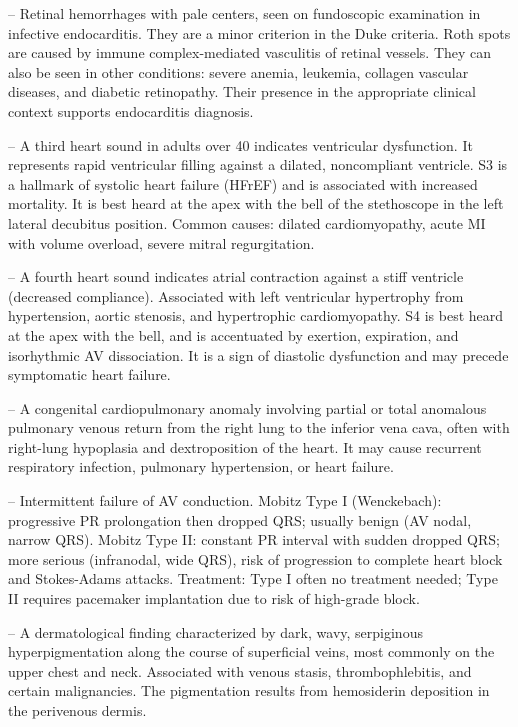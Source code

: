 -- Retinal hemorrhages with pale centers, seen on fundoscopic examination in infective endocarditis. They are a minor criterion in the Duke criteria. Roth spots are caused by immune complex-mediated vasculitis of retinal vessels. They can also be seen in other conditions: severe anemia, leukemia, collagen vascular diseases, and diabetic retinopathy. Their presence in the appropriate clinical context supports endocarditis diagnosis.

-- A third heart sound in adults over 40 indicates ventricular dysfunction. It represents rapid ventricular filling against a dilated, noncompliant ventricle. S3 is a hallmark of systolic heart failure (HFrEF) and is associated with increased mortality. It is best heard at the apex with the bell of the stethoscope in the left lateral decubitus position. Common causes: dilated cardiomyopathy, acute MI with volume overload, severe mitral regurgitation.

-- A fourth heart sound indicates atrial contraction against a stiff ventricle (decreased compliance). Associated with left ventricular hypertrophy from hypertension, aortic stenosis, and hypertrophic cardiomyopathy. S4 is best heard at the apex with the bell, and is accentuated by exertion, expiration, and isorhythmic AV dissociation. It is a sign of diastolic dysfunction and may precede symptomatic heart failure.

-- A congenital cardiopulmonary anomaly involving partial or total anomalous pulmonary venous return from the right lung to the inferior vena cava, often with right-lung hypoplasia and dextroposition of the heart. It may cause recurrent respiratory infection, pulmonary hypertension, or heart failure.

-- Intermittent failure of AV conduction. Mobitz Type I (Wenckebach): progressive PR prolongation then dropped QRS; usually benign (AV nodal, narrow QRS). Mobitz Type II: constant PR interval with sudden dropped QRS; more serious (infranodal, wide QRS), risk of progression to complete heart block and Stokes-Adams attacks. Treatment: Type I often no treatment needed; Type II requires pacemaker implantation due to risk of high-grade block.

-- A dermatological finding characterized by dark, wavy, serpiginous hyperpigmentation along the course of superficial veins, most commonly on the upper chest and neck. Associated with venous stasis, thrombophlebitis, and certain malignancies. The pigmentation results from hemosiderin deposition in the perivenous dermis.

